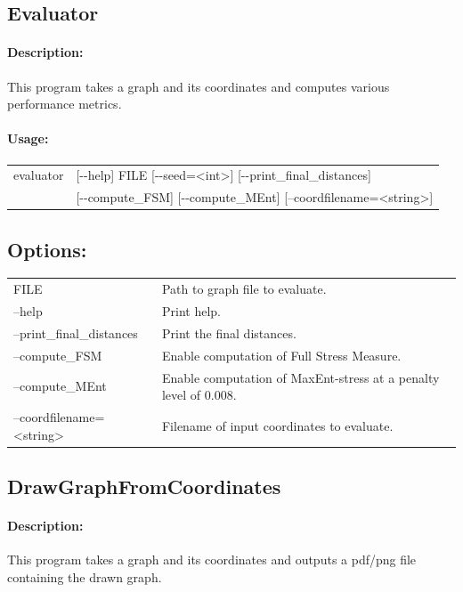 \documentclass[11pt]{article}
\begin{document}
\vfill
\pagebreak
\subsection{Evaluator}
\paragraph*{Description:} This program takes a graph and its coordinates and computes various performance metrics.
\paragraph*{Usage:\\} 

\begin{tabular}{ll}
evaluator &   [-{}-help] FILE [-{}-seed=<int>] [-{}-print\_final\_distances]  \\
& [-{}-compute\_FSM] [-{}-compute\_MEnt] [--coordfilename=<string>]

\end{tabular}
                          
\subsection*{Options:\\}

\begin{tabularx}{\textwidth}{lX}
  FILE                          & Path to graph file to evaluate.\\
  --help                        & Print help. \\
  --print\_final\_distances     & Print the final distances. \\
  --compute\_FSM                & Enable computation of Full Stress Measure.\\
  --compute\_MEnt               & Enable computation of MaxEnt-stress at a penalty level of 0.008.\\
  --coordfilename=<string>      & Filename of input coordinates to evaluate. \\
\end{tabularx}
\subsection{DrawGraphFromCoordinates}
\paragraph*{Description:} This program takes a graph and its coordinates and outputs a pdf/png file containing the drawn graph.
\end{document}
